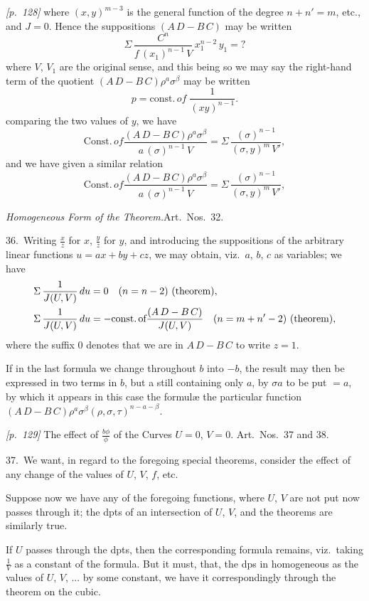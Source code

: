 \documentclass[11pt,a4paper]{article}
\theoremstyle{plain}
\theoremstyle{definition}
\theoremstyle{remark}
\begin{document}
\noindent\textit{[p.~128]} where $(x, y)^{m-3}$ is the general function of the degree $n + n' = m$, etc., and $J = 0$. Hence the suppositions $(A\,D - B\,C)$ may be written
\[
\Sigma\,\frac{C^{n}}{f\,(x_1)^{n-1}\,V}\,x_1^{n-2}\,y_1 = ?
\]
where $V$, $V_1$ are the original sense, and this being so we may say the right-hand term of the quotient $(A\,D - B\,C)\rho^a \sigma^\beta$ may be written
\[
p = \text{const.}\,of \;\frac{1}{(xy)^{n-1}}.
\]
comparing the two values of $y$, we have
\[
\text{Const.}\,of\frac{(A\,D - B\,C)\rho^a \sigma^\beta}{a\,(\sigma)^{n - 1}\,V} = \Sigma\,\frac{(\sigma)^{n - 1}}{(\sigma, y)^{m}\,V'},
\]
and we have given a similar relation
\[
\text{Const.}\,of\frac{(A\,D - B\,C)\rho^a \sigma^\beta}{a\,(\sigma)^{n - 1}\,V} = \Sigma\,\frac{(\sigma)^{n - 1}}{(\sigma, y)^{m}\,V'},
\]

\textit{Homogeneous Form of the Theorem.}\quad Art.\ Nos.~32.

36.\ Writing $\frac{x}{z}$ for $x$, $\frac{y}{z}$ for $y$, and introducing the suppositions of the arbitrary linear functions $u = ax + by + cz$, we may obtain, viz.\ $a$, $b$, $c$ as variables; we have
\begin{align*}
\Sigma\,\frac{1}{J(U, V)}\,du &= 0\quad (n = n - 2)\,\,\text{(theorem)},\\
\Sigma\,\frac{1}{J(U, V)}\,du &= -\text{const.\,of}\frac{(A\,D - B\,C)}{J(U, V)}\quad (n = m + n' - 2)\,\,\text{(theorem)},
\end{align*}
where the suffix 0 denotes that we are in $A\,D - B\,C$ to write $z = 1$.

If in the last formula we change throughout $b$ into $-b$, the result may then be expressed in two terms in $b$, but a still containing only $a$, by $\sigma a$ to be put $= a$, by which it appears in this case the formul\ae{} the particular function $(A\,D - B\,C)\rho^a \sigma^\beta (\rho, \sigma, \tau)^{n - a - \beta}$.

\bigskip\noindent\textit{[p.~129]} The effect of $\frac{b\phi}{\phi}$ of the Curves $U = 0$, $V = 0$. Art.\ Nos.~37 and 38.

37.\ We want, in regard to the foregoing special theorems, consider the effect of any change of the values of $U$, $V$, $f$, etc.

Suppose now we have any of the foregoing functions, where $U$, $V$ are not put now passes through it; the dpts of an intersection of $U$, $V$, and the theorems are similarly true.

If $U$ passes through the dpts, then the corresponding formula remains, viz.\ taking $\frac{1}{V}$ as a constant of the formula. But it must, that, the dps in homogeneous as the values of $U$, $V$, ... by some constant, we have it correspondingly through the theorem on the cubic.
\end{document}
